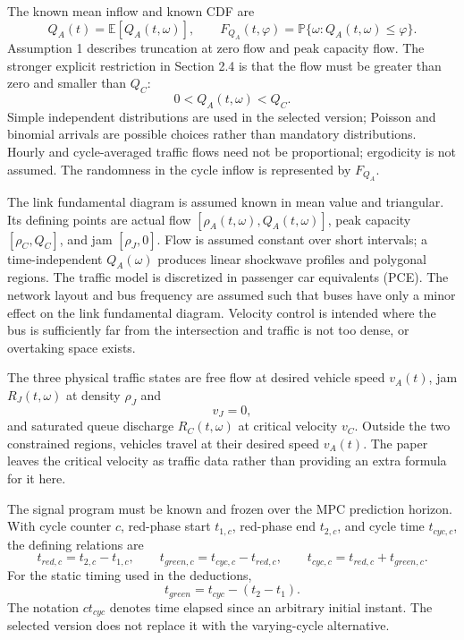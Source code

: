 \documentclass{article}
\begin{document}
The known mean inflow and known CDF are
\[
Q_A(t)=\mathbb E[Q_A(t,\omega)],\qquad
F_{Q_A}(t,\varphi)=\mathbb P\{\omega:Q_A(t,\omega)\leq\varphi\}.
\]
Assumption 1 describes truncation at zero flow and peak capacity flow. The stronger explicit restriction in Section 2.4 is that the flow must be greater than zero and smaller than \(Q_C\):
\[
0<Q_A(t,\omega)<Q_C.
\]
Simple independent distributions are used in the selected version; Poisson and binomial arrivals are possible choices rather than mandatory distributions. Hourly and cycle-averaged traffic flows need not be proportional; ergodicity is not assumed. The randomness in the cycle inflow is represented by \(F_{Q_A}\).

The link fundamental diagram is assumed known in mean value and triangular. Its defining points are actual flow \([\rho_A(t,\omega),Q_A(t,\omega)]\), peak capacity \([\rho_C,Q_C]\), and jam \([\rho_J,0]\). Flow is assumed constant over short intervals; a time-independent \(Q_A(\omega)\) produces linear shockwave profiles and polygonal regions. The traffic model is discretized in passenger car equivalents (PCE). The network layout and bus frequency are assumed such that buses have only a minor effect on the link fundamental diagram. Velocity control is intended where the bus is sufficiently far from the intersection and traffic is not too dense, or overtaking space exists.

The three physical traffic states are free flow at desired vehicle speed \(v_A(t)\), jam \(R_J(t,\omega)\) at density \(\rho_J\) and
\[
v_J=0,
\]
and saturated queue discharge \(R_C(t,\omega)\) at critical velocity \(v_C\). Outside the two constrained regions, vehicles travel at their desired speed \(v_A(t)\). The paper leaves the critical velocity as traffic data rather than providing an extra formula for it here.

The signal program must be known and frozen over the MPC prediction horizon. With cycle counter \(c\), red-phase start \(t_{1,c}\), red-phase end \(t_{2,c}\), and cycle time \(t_{cyc,c}\), the defining relations are
\[
t_{red,c}=t_{2,c}-t_{1,c},\qquad
t_{green,c}=t_{cyc,c}-t_{red,c},\qquad
t_{cyc,c}=t_{red,c}+t_{green,c}.
\]
For the static timing used in the deductions,
\[
t_{green}=t_{cyc}-(t_2-t_1).
\]
The notation \(ct_{cyc}\) denotes time elapsed since an arbitrary initial instant. The selected version does not replace it with the varying-cycle alternative.
\end{document}
